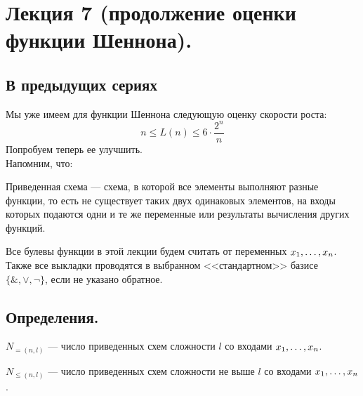 \section{Лекция 7 (продолжение оценки функции Шеннона).} 
\subsection{В предыдущих сериях}
Мы уже имеем для функции Шеннона следующую оценку скорости роста:
$$n\leq L(n)\leq 6\cdot \frac{2^n}{n}$$
Попробуем теперь ее улучшить.\\
Напомним, что:
\begin{definition}
Приведенная схема --- схема, в которой все элементы выполняют разные функции, то есть не существует таких двух одинаковых элементов, на входы которых подаются одни и те же переменные или результаты вычисления других функций.
\end{definition}
Все булевы функции в этой лекции будем считать от переменных $x_1, \ldots, x_n$. Также все выкладки проводятся в выбранном <<стандартном>> базисе $\{\& ,\vee ,\neg\}$, если не указано обратное.
\subsection{Определения.}
\begin{definition}
$N_{=(n,l)}$ --- число приведенных схем сложности $l$ со входами $x_1, \ldots, x_n$.
\end{definition}
\begin{definition}
$N_{\leq(n,l)}$ --- число приведенных схем сложности не выше $l$ со входами $x_1, \ldots, x_n$.
\end{definition}
